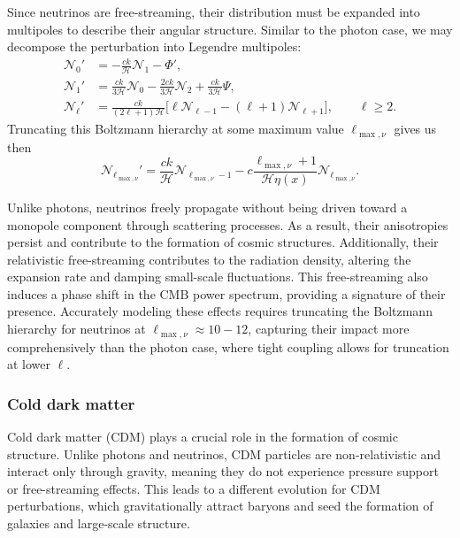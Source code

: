 \documentclass{aa}
\numberwithin{equation}{section}
\numberwithin{table}{section}
\numberwithin{figure}{section}
\begin{document}
Since neutrinos are free-streaming, their distribution must be expanded into multipoles to describe their angular structure. Similar to the photon case, we may decompose the perturbation into Legendre multipoles:
\begin{align}
\mathcal{N}_0' &= -\frac{ck}{\mathcal{H}} \mathcal{N}_1 - \Phi', \\
\mathcal{N}_1' &= \frac{ck}{3\mathcal{H}} \mathcal{N}_0 - \frac{2ck}{3\mathcal{H}} \mathcal{N}_2 + \frac{ck}{3\mathcal{H}} \Psi, \\
\mathcal{N}_\ell' &= \frac{ck}{(2\ell + 1)\mathcal{H}} \Big[\ell\mathcal{N}_{\ell-1} -(\ell+1)\mathcal{N}_{\ell+1}\Big], \qquad \ell \geq 2.
\end{align}
Truncating this Boltzmann hierarchy at some maximum value $\ell_{\max,\nu}$ gives us then
\begin{equation}
  \mathcal{N}_{\ell_{\max,\nu}}' = \frac{ck}{\mathcal{H}} \mathcal{N}_{\ell_{\max,\nu}-1} - c \frac{\ell_{\max,\nu} + 1}{\mathcal{H} \eta(x)} \mathcal{N}_{\ell_{\max,\nu}}.
\end{equation}

Unlike photons, neutrinos freely propagate without being driven toward a monopole component through scattering processes. As a result, their anisotropies persist and contribute to the formation of cosmic structures. Additionally, their relativistic free-streaming contributes to the radiation density, altering the expansion rate and damping small-scale fluctuations. This free-streaming also induces a phase shift in the CMB power spectrum, providing a signature of their presence. Accurately modeling these effects requires truncating the Boltzmann hierarchy for neutrinos at $\ell_{\max, \nu} \approx 10-12$, capturing their impact more comprehensively than the photon case, where tight coupling allows for truncation at lower $\ell$.



\subsubsection{Cold dark matter}
Cold dark matter (CDM) plays a crucial role in the formation of cosmic structure. Unlike photons and neutrinos, CDM particles are non-relativistic and interact only through gravity, meaning they do not experience pressure support or free-streaming effects. This leads to a different evolution for CDM perturbations, which gravitationally attract baryons and seed the formation of galaxies and large-scale structure.
\end{document}
